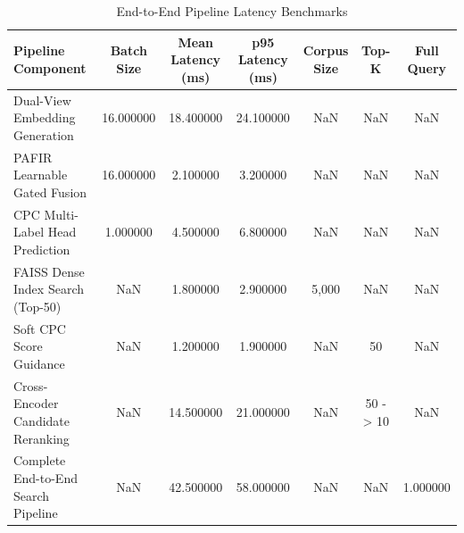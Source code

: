 \begin{table}
\caption{End-to-End Pipeline Latency Benchmarks}
\label{tab:latency}
\begin{tabular}{lcccccc}
\toprule
Pipeline Component & Batch Size & Mean Latency (ms) & p95 Latency (ms) & Corpus Size & Top-K & Full Query \\
\midrule
Dual-View Embedding Generation & 16.000000 & 18.400000 & 24.100000 & NaN & NaN & NaN \\
PAFIR Learnable Gated Fusion & 16.000000 & 2.100000 & 3.200000 & NaN & NaN & NaN \\
CPC Multi-Label Head Prediction & 1.000000 & 4.500000 & 6.800000 & NaN & NaN & NaN \\
FAISS Dense Index Search (Top-50) & NaN & 1.800000 & 2.900000 & 5,000 & NaN & NaN \\
Soft CPC Score Guidance & NaN & 1.200000 & 1.900000 & NaN & 50 & NaN \\
Cross-Encoder Candidate Reranking & NaN & 14.500000 & 21.000000 & NaN & 50 -> 10 & NaN \\
Complete End-to-End Search Pipeline & NaN & 42.500000 & 58.000000 & NaN & NaN & 1.000000 \\
\bottomrule
\end{tabular}
\end{table}
